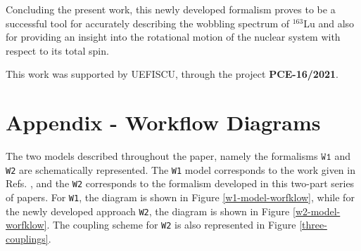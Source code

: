 \documentclass[myclassdoc,debug]{rjparticle}
\begin{document}
Concluding the present work, this newly developed formalism proves to be a successful tool for accurately describing the wobbling spectrum of $^{163}$Lu and also for providing an insight into the rotational motion of the nuclear system with respect to its total spin.

\begin{acknowledgement}
This work was supported by UEFISCU, through the project \textbf{PCE-16/2021}.
\end{acknowledgement}

\appendix
\section{Appendix - Workflow Diagrams}
\label{appendix:a}
The two models described throughout the paper, namely the formalisms $\texttt{W1}$ and \texttt{W2} are schematically represented. The \texttt{W1} model corresponds to the work given in Refs. \cite{raduta2020approach,raduta2020towards}, and the \texttt{W2} corresponds to the formalism developed in this two-part series of papers. For \texttt{W1}, the diagram is shown in Figure \ref{w1-model-worfklow}, while for the newly developed approach \texttt{W2}, the diagram is shown in Figure \ref{w2-model-worfklow}. The coupling scheme for \texttt{W2} is also represented in Figure \ref{three-couplings}.
\end{document}

